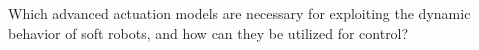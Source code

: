 \begin{researchquestion}\label{rq:actuation_models}
    Which advanced actuation models are necessary for exploiting the dynamic behavior of soft robots, and how can they be utilized for control?
\end{researchquestion}
